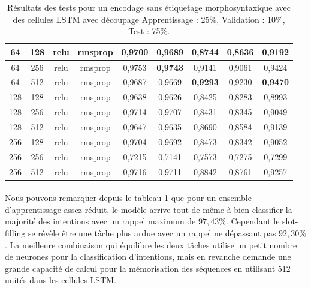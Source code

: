 \begin{table}[H]
{\begin{tabular}{|c|c|c|c|c|c|c|c|c|}
				64 & 128 & relu & rmsprop & 0,9700 & 0,9689 & 0,8744 & 0,8636 & 0,9192 \\ \hline
				64 & 256 & relu & rmsprop & 0,9753 & \textbf{0,9743} & 0,9141 & 0,9061 & 0,9424 \\ \hline
				\rowcolor[HTML]{96FFFB} 
				64 & 512 & relu & rmsprop & 0,9687 & 0,9669 & \textbf{0,9293} & 0,9230 & \textbf{0,9470} \\ \hline
				128 & 128 & relu & rmsprop & 0,9638 & 0,9626 & 0,8425 & 0,8283 & 0,8993 \\ \hline
				128 & 256 & relu & rmsprop & 0,9714 & 0,9707 & 0,8431 & 0,8345 & 0,9049 \\ \hline
				128 & 512 & relu & rmsprop & 0,9647 & 0,9635 & 0,8690 & 0,8584 & 0,9139 \\ \hline
				256 & 128 & relu & rmsprop & 0,9704 & 0,9692 & 0,8473 & 0,8342 & 0,9052 \\ \hline
				256 & 256 & relu & rmsprop & 0,7215 & 0,7141 & 0,7573 & 0,7275 & 0,7299 \\ \hline
				256 & 512 & relu & rmsprop & 0,9716 & 0,9711 & 0,8842 & 0,8761 & 0,9257 \\ \hline
			\end{tabular}%
		}
		\caption{Résultats des tests pour un encodage sans étiquetage morphosyntaxique avec des cellules LSTM avec découpage Apprentissage : 25\%, Validation : 10\%, Test : 75\%.}
		\label{tab:lstm_1}
	\end{table}
	
	\paragraph{}
	Nous pouvons remarquer depuis le tableau \ref{tab:lstm_1} que pour un ensemble d'apprentissage assez réduit, le modèle arrive tout de même à bien classifier la majorité des intentions avec un rappel maximum de $97,43\%$. Cependant le slot-filling se révèle être une tâche plus ardue avec un rappel ne dépassant pas $92,30\%$. La meilleure combinaison qui équilibre les deux tâches utilise un petit nombre de neurones pour la classification d'intentions, mais en revanche demande une grande capacité de calcul pour la mémorisation des séquences en utilisant 512 unités dans les cellules LSTM.
	
